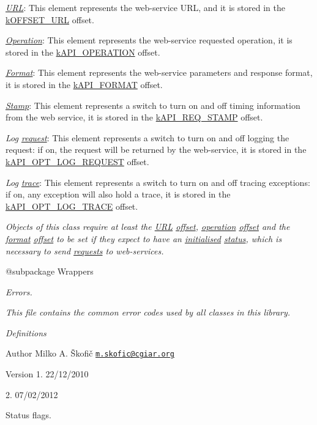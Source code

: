 {\itshape 
\begin{DoxyItemize}
\item {\itshape \hyperlink{}{U\-R\-L}}\-: This element represents the web-\/service U\-R\-L, and it is stored in the \hyperlink{}{k\-O\-F\-F\-S\-E\-T\-\_\-\-U\-R\-L} offset. 
\item {\itshape \hyperlink{}{Operation}}\-: This element represents the web-\/service requested operation, it is stored in the \hyperlink{}{k\-A\-P\-I\-\_\-\-O\-P\-E\-R\-A\-T\-I\-O\-N} offset. 
\item {\itshape \hyperlink{}{Format}}\-: This element represents the web-\/service parameters and response format, it is stored in the \hyperlink{}{k\-A\-P\-I\-\_\-\-F\-O\-R\-M\-A\-T} offset. 
\item {\itshape \hyperlink{}{Stamp}}\-: This element represents a switch to turn on and off timing information from the web service, it is stored in the \hyperlink{}{k\-A\-P\-I\-\_\-\-R\-E\-Q\-\_\-\-S\-T\-A\-M\-P} offset. 
\item {\itshape Log \hyperlink{}{request}}\-: This element represents a switch to turn on and off logging the request\-: if on, the request will be returned by the web-\/service, it is stored in the \hyperlink{}{k\-A\-P\-I\-\_\-\-O\-P\-T\-\_\-\-L\-O\-G\-\_\-\-R\-E\-Q\-U\-E\-S\-T} offset. 
\item {\itshape Log \hyperlink{}{trace}}\-: This element represents a switch to turn on and off tracing exceptions\-: if on, any exception will also hold a trace, it is stored in the \hyperlink{}{k\-A\-P\-I\-\_\-\-O\-P\-T\-\_\-\-L\-O\-G\-\_\-\-T\-R\-A\-C\-E} offset. 
\end{DoxyItemize}}

{\itshape Objects of this class require at least the \hyperlink{}{U\-R\-L} \hyperlink{}{offset}, \hyperlink{}{operation} \hyperlink{}{offset} and the \hyperlink{}{format} \hyperlink{}{offset} to be set if they expect to have an \hyperlink{}{initialised} \hyperlink{}{status}, which is necessary to send \hyperlink{}{requests} to web-\/services.}

{\itshape \begin{DoxyVerb} @subpackage        Wrappers\end{DoxyVerb}
}

{\itshape Errors.}

{\itshape This file contains the common error codes used by all classes in this library.}

{\itshape  Definitions}

{\itshape \begin{DoxyAuthor}{Author}
Milko A. Škofič \href{mailto:m.skofic@cgiar.org}{\tt m.\-skofic@cgiar.\-org} 
\end{DoxyAuthor}
\begin{DoxyVersion}{Version}
1. 22/12/2010 

2. 07/02/2012
\end{DoxyVersion}
Status flags.}

